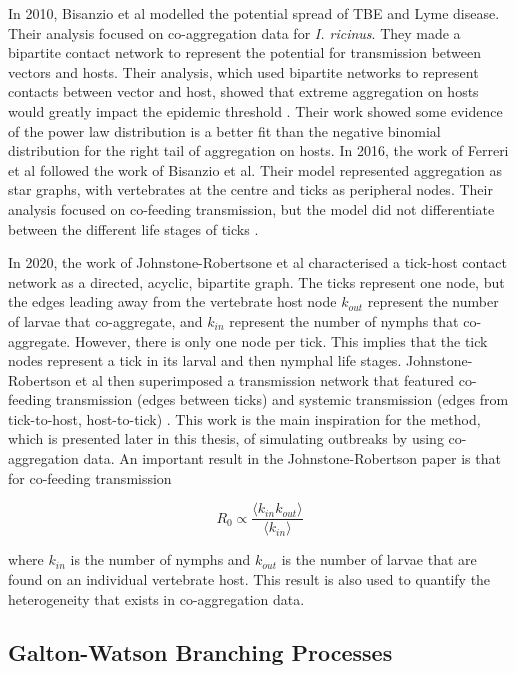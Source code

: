 \documentclass{article}
\begin{document}
In 2010, Bisanzio et al modelled the potential spread of TBE and Lyme disease. Their analysis focused on co-aggregation data for \textit{I. ricinus}. They made a bipartite contact network to represent the potential for transmission between vectors and hosts. Their analysis, which used bipartite networks to represent contacts between vector and host, showed that extreme aggregation on hosts would greatly impact the epidemic threshold \cite{Bisanzio2010}. Their work showed some evidence of the power law distribution is a better fit than the negative binomial distribution for the right tail of aggregation on hosts. In 2016, the work of Ferreri et al followed the work of Bisanzio et al. Their model represented aggregation as star graphs, with vertebrates at the centre and ticks as peripheral nodes. Their analysis focused on co-feeding transmission, but the model did not differentiate between the different life stages of ticks \cite{ferreri2016}.

In 2020, the work of Johnstone-Robertsone et al characterised a tick-host contact network as a directed, acyclic, bipartite graph. The ticks represent one node, but the edges leading away from the vertebrate host node $ k_{out} $ represent the number of larvae that co-aggregate, and $ k_{in} $ represent the number of nymphs that co-aggregate. However, there is only one node per tick. This implies that the tick nodes represent a tick in its larval and then nymphal life stages. Johnstone-Robertson et al then superimposed a transmission network that featured co-feeding transmission (edges between ticks) and systemic transmission (edges from tick-to-host, host-to-tick) \cite{JohnstoneRobertson2020}. This work is the main inspiration for the method, which is presented later in this thesis, of simulating outbreaks by using co-aggregation data. An important result in the Johnstone-Robertson paper is that for co-feeding transmission

\begin{equation} \label{JohnstoneRobertsonR0Estimate}
	R_0 \propto \frac{\langle k_{in}k_{out} \rangle}{\langle k_{in} \rangle } 
\end{equation}

where $ k_{in} $ is the number of nymphs and $ k_{out} $ is the number of larvae that are found on an individual vertebrate host. This result is also used to quantify the heterogeneity that exists in co-aggregation data.

\subsection{Galton-Watson Branching Processes}
\end{document}
